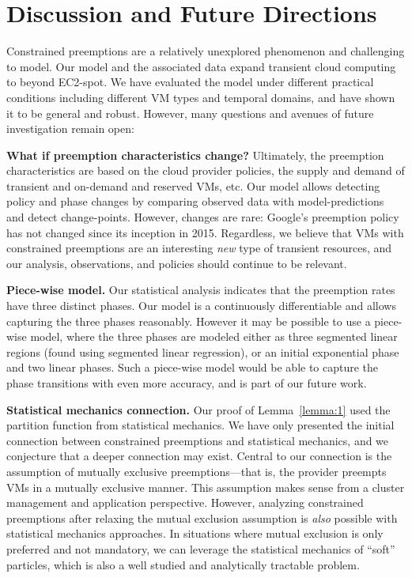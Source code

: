 \section{Discussion and Future Directions}
\label{sec:discussion}


Constrained preemptions are a relatively unexplored phenomenon and challenging to model.
Our model and the associated data expand transient cloud computing to beyond EC2-spot.
We have evaluated the model under different practical conditions including different VM types and temporal domains, and have shown it to be general and robust. 
However, many questions and avenues of future investigation remain open:

\noindent \textbf{What if preemption characteristics change?}
Ultimately, the preemption characteristics are based on the cloud provider policies, the supply and demand of transient and on-demand and reserved VMs, etc. 
Our model allows detecting policy and phase changes by comparing observed data with model-predictions and detect change-points.
However, changes are rare: Google's preemption policy has not changed since its inception in 2015. 
Regardless, we believe that VMs with constrained preemptions are an interesting \emph{new} type of transient resources, and our analysis, observations, and policies should continue to be relevant. 


\noindent \textbf{Piece-wise model.}
Our statistical analysis indicates that the preemption rates have three distinct phases. 
Our model is a continuously differentiable and allows capturing the three phases reasonably. 
However it may be possible to use a piece-wise model, where the three phases are modeled either as three segmented linear regions (found using segmented linear regression), or an initial exponential phase and two linear phases. 
Such a piece-wise model would be able to capture the phase transitions with even more accuracy, and is part of our future work. 

\noindent \textbf{Statistical mechanics connection.} Our proof of Lemma~\ref{lemma:1} used the partition function from statistical mechanics. 
We have only presented the initial connection between constrained preemptions and statistical mechanics, and we conjecture that a deeper connection may exist. 
Central to our connection is the assumption of mutually exclusive preemptions---that is, the provider preempts VMs in a mutually exclusive manner.
This assumption makes sense from a cluster management and application perspective. 
However,  analyzing constrained preemptions after relaxing the mutual exclusion assumption is \emph{also} possible with statistical mechanics approaches. 
In situations where mutual exclusion is only preferred and not mandatory, we can leverage the statistical mechanics of ``soft'' particles, which is also a well studied and analytically tractable problem. 

